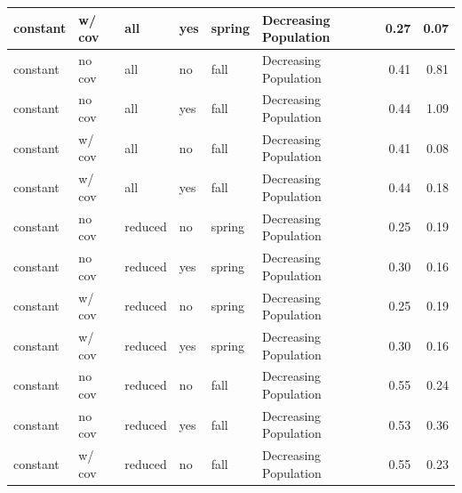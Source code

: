 \documentclass[
  12pt,
]{article}
\begin{document}
\begin{table}
\begin{tabular}{l|l|l|l|l|l|r|r}
\hline
\hspace{1em}\hspace{1em}constant & w/ cov & all & yes & spring & Decreasing Population & 0.27 & 0.07\\
\hline
\hspace{1em}\hspace{1em}constant & no cov & all & no & fall & Decreasing Population & 0.41 & 0.81\\
\hline
\hspace{1em}\hspace{1em}constant & no cov & all & yes & fall & Decreasing Population & 0.44 & 1.09\\
\hline
\hspace{1em}\hspace{1em}constant & w/ cov & all & no & fall & Decreasing Population & 0.41 & 0.08\\
\hline
\hspace{1em}\hspace{1em}constant & w/ cov & all & yes & fall & Decreasing Population & 0.44 & 0.18\\
\hline
\hspace{1em}\hspace{1em}constant & no cov & reduced & no & spring & Decreasing Population & 0.25 & 0.19\\
\hline
\hspace{1em}\hspace{1em}constant & no cov & reduced & yes & spring & Decreasing Population & 0.30 & 0.16\\
\hline
\hspace{1em}\hspace{1em}constant & w/ cov & reduced & no & spring & Decreasing Population & 0.25 & 0.19\\
\hline
\hspace{1em}\hspace{1em}constant & w/ cov & reduced & yes & spring & Decreasing Population & 0.30 & 0.16\\
\hline
\hspace{1em}\hspace{1em}constant & no cov & reduced & no & fall & Decreasing Population & 0.55 & 0.24\\
\hline
\hspace{1em}\hspace{1em}constant & no cov & reduced & yes & fall & Decreasing Population & 0.53 & 0.36\\
\hline
\hspace{1em}\hspace{1em}constant & w/ cov & reduced & no & fall & Decreasing Population & 0.55 & 0.23\\

\end{tabular}
\end{table}
\end{document}
